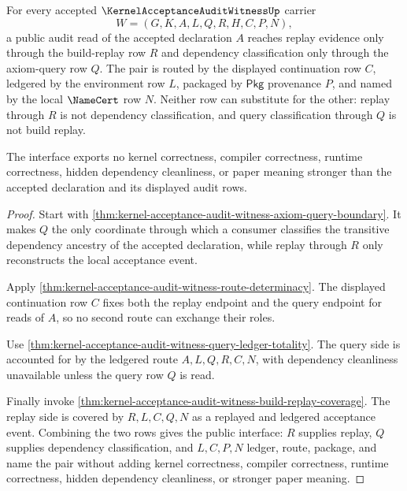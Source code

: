 \begin{theorem}
\label{thm:kernel-acceptance-audit-witness-query-replay-interface}
For every accepted $\KernelAcceptanceAuditWitnessUp$ carrier
$$
W=(G,K,A,L,Q,R,H,C,P,N),
$$
a public audit read of the accepted declaration $A$ reaches replay evidence
only through the build-replay row $R$ and dependency classification only
through the axiom-query row $Q$. The pair is routed by the displayed
continuation row $C$, ledgered by the environment row $L$, packaged by
$\mathsf{Pkg}$ provenance $P$, and named by the local $\NameCert$ row $N$.
Neither row can substitute for the other: replay through $R$ is not dependency
classification, and query classification through $Q$ is not build replay.

The interface exports no kernel correctness, compiler correctness, runtime
correctness, hidden dependency cleanliness, or paper meaning stronger than the
accepted declaration and its displayed audit rows.
\end{theorem}
\begin{proof}
Start with \autoref{thm:kernel-acceptance-audit-witness-axiom-query-boundary}.
It makes $Q$ the only coordinate through which a consumer classifies the
transitive dependency ancestry of the accepted declaration, while replay
through $R$ only reconstructs the local acceptance event.

Apply \autoref{thm:kernel-acceptance-audit-witness-route-determinacy}. The
displayed continuation row $C$ fixes both the replay endpoint and the query
endpoint for reads of $A$, so no second route can exchange their roles.

Use \autoref{thm:kernel-acceptance-audit-witness-query-ledger-totality}. The
query side is accounted for by the ledgered route $A,L,Q,R,C,N$, with
dependency cleanliness unavailable unless the query row $Q$ is read.

Finally invoke \autoref{thm:kernel-acceptance-audit-witness-build-replay-coverage}.
The replay side is covered by $R,L,C,Q,N$ as a replayed and ledgered acceptance
event. Combining the two rows gives the public interface: $R$ supplies replay,
$Q$ supplies dependency classification, and $L,C,P,N$ ledger, route, package,
and name the pair without adding kernel correctness, compiler correctness,
runtime correctness, hidden dependency cleanliness, or stronger paper meaning.
\end{proof}

